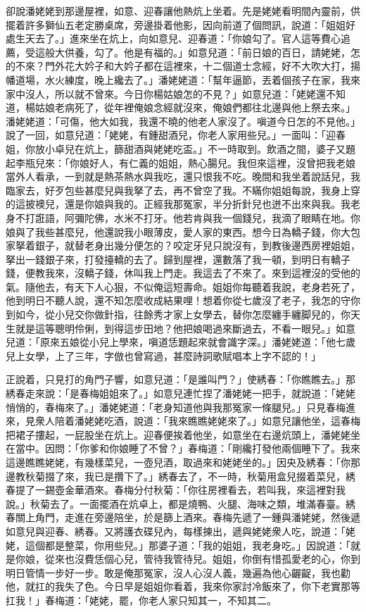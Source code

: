 卻說潘姥姥到那邊屋裡，如意、迎春讓他熱炕上坐着。先是姥姥看明間內靈前，供擺着許多獅仙五老定勝桌席，旁邊掛着他影，因向前道了個問訊，說道：「姐姐好處生天去了。」進來坐在炕上，向如意兒、迎春道：「你娘勾了。官人這等費心追薦，受這般大供養，勾了。他是有福的。」{}如意兒道：「前日娘的百日，請姥姥，怎的不來？門外花大妗子和大妗子都在這裡來，十二個道士念經，好不大吹大打，揚幡道場，水火練度，晚上纔去了。」潘姥姥道：「幫年逼節，丟着個孩子在家，我來家中沒人，所以就不曾來。今日你楊姑娘怎的不見？」如意兒道：「姥姥還不知道，楊姑娘老病死了，從年裡俺娘念經就沒來，俺娘們都往北邊與他上祭去來。」潘姥姥道：「可傷，他大如我，我還不曉的他老人家沒了。嗔道今日怎的不見他。」說了一回，如意兒道：「姥姥，有鍾甜酒兒，你老人家用些兒。」一面叫：「迎春姐，你放小卓兒在炕上，篩甜酒與姥姥吃盃。」不一時取到。飲酒之間，婆子又題起李瓶兒來：「你娘好人，有仁義的姐姐，熱心腸兒。{}我但來這裡，沒曾把我老娘當外人看承，一到就是熱茶熱水與我吃，還只恨我不吃。晚間和我坐着說話兒，我臨家去，好歹包些甚麼兒與我拏了去，再不曾空了我。不瞞你姐姐每說，我身上穿的這披襖兒，還是你娘與我的。{}正經我那冤家，半分折針兒也迸不出來與我。我老身不打誑語，阿彌陀佛，{}水米不打牙。他若肯與我一個錢兒，我滴了眼睛在地。你娘與了我些甚麼兒，他還說我小眼薄皮，愛人家的東西。想今日為轎子錢，你大包家拏着銀子，就替老身出幾分便怎的？咬定牙兒只說沒有，到教後邊西房裡姐姐，拏出一錢銀子來，打發擡轎的去了。歸到屋裡，還數落了我一頓，到明日有轎子錢，便教我來，沒轎子錢，休叫我上門走。我這去了不來了。{}來到這裡沒的受他的氣。隨他去，有天下人心狠，不似俺這短壽命。姐姐你每聽着我說，老身若死了，他到明日不聽人說，還不知怎麼收成結果哩！{}想着你從七歲沒了老子，我怎的守你到如今，從小兒交你做針指，往餘秀才家上女學去，替你怎麼纏手纏脚兒的，你天生就是這等聰明伶俐，到得這步田地？他把娘喝過來斷過去，不看一眼兒。」如意兒道：「原來五娘從小兒上學來，嗔道恁題起來就會識字深。」潘姥姥道：「他七歲兒上女學，上了三年，字倣也曾寫過，甚麼詩詞歌賦唱本上字不認的！」

正說着，只見打的角門子響，如意兒道：「是誰叫門？」使綉春：「你瞧瞧去。」那綉春走來說：「是春梅姐姐來了。」如意兒連忙捏了潘姥姥一把手，{}就說道：「姥姥悄悄的，春梅來了。」潘姥姥道：「老身知道他與我那冤家一條腿兒。」只見春梅進來，見衆人陪着潘姥姥吃酒，說道：「我來瞧瞧姥姥來了。」如意兒讓他坐，這春梅把裙子摟起，一屁股坐在炕上。迎春便挨着他坐，如意坐在右邊炕頭上，潘姥姥坐在當中。因問：「你爹和你娘睡了不曾？」春梅道：「剛纔打發他兩個睡下了。我來這邊瞧瞧姥姥，有幾樣菜兒，一壺兒酒，取過來和姥姥坐的。」因央及綉春：「你那邊教秋菊掇了來，我已是攢下了。」綉春去了，不一時，秋菊用盒兒掇着菜兒，綉春提了一錫壺金華酒來。春梅分付秋菊：「你往房裡看去，若叫我，來這裡對我說。」秋菊去了。一面擺酒在炕卓上，都是燒鴨、火腿、海味之類，堆滿春臺。綉春關上角門，走進在旁邊陪坐，於是篩上酒來。春梅先遞了一鍾與潘姥姥，然後遞如意兒與迎春、綉春。又將護衣碟兒內，每樣揀出，遞與姥姥衆人吃，說道：「姥姥，這個都是整菜，你用些兒。」那婆子道：「我的姐姐，我老身吃。」因說道：「就是你娘，從來也沒費恁個心兒，管待我管待兒。姐姐，你倒有惜孤愛老的心，你到明日管情一步好一步。敢是俺那冤家，沒人心沒人義，幾遍為他心齷齪，我也勸他，就扛的我失了色。今日早是姐姐你看着，我來你家討冷飯來了，你下老實那等扛我！」春梅道：「姥姥，罷，你老人家只知其一，不知其二。

